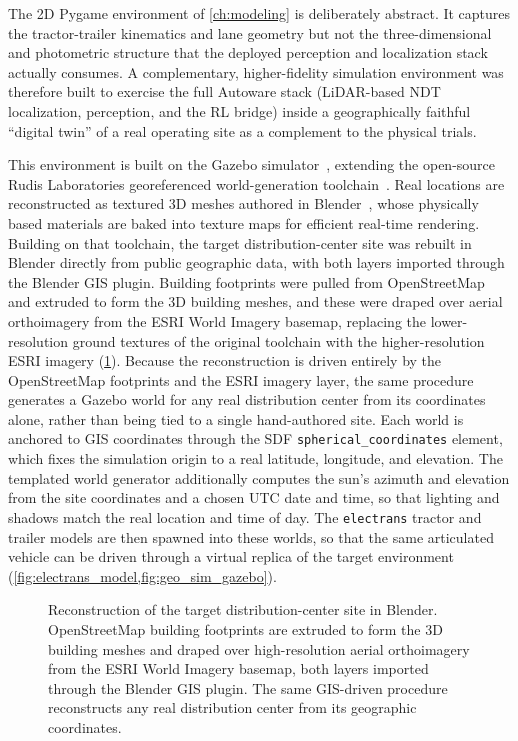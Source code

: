 The 2D Pygame environment of \cref{ch:modeling} is deliberately abstract. It captures the tractor-trailer kinematics and lane geometry but not the three-dimensional and photometric structure that the deployed perception and localization stack actually consumes. A complementary, higher-fidelity simulation environment was therefore built to exercise the full Autoware stack (LiDAR-based NDT localization, perception, and the RL bridge) inside a geographically faithful ``digital twin'' of a real operating site as a complement to the physical trials.

This environment is built on the Gazebo simulator~\cite{koenig2004gazebo}, extending the open-source Rudis Laboratories georeferenced world-generation toolchain~\cite{perseghetti2021rudisworlds}. Real locations are reconstructed as textured 3D meshes authored in Blender~\cite{blender}, whose physically based materials are baked into texture maps for efficient real-time rendering. Building on that toolchain, the target distribution-center site was rebuilt in Blender directly from public geographic data, with both layers imported through the Blender GIS plugin. Building footprints were pulled from OpenStreetMap~\cite{openstreetmap} and extruded to form the 3D building meshes, and these were draped over aerial orthoimagery from the ESRI World Imagery basemap, replacing the lower-resolution ground textures of the original toolchain with the higher-resolution ESRI imagery (\cref{fig:geo_sim_blender}). Because the reconstruction is driven entirely by the OpenStreetMap footprints and the ESRI imagery layer, the same procedure generates a Gazebo world for any real distribution center from its coordinates alone, rather than being tied to a single hand-authored site. Each world is anchored to GIS coordinates through the SDF \texttt{spherical\_coordinates} element, which fixes the simulation origin to a real latitude, longitude, and elevation. The templated world generator additionally computes the sun's azimuth and elevation from the site coordinates and a chosen UTC date and time, so that lighting and shadows match the real location and time of day. The \texttt{electrans} tractor and trailer models are then spawned into these worlds, so that the same articulated vehicle can be driven through a virtual replica of the target environment (\cref{fig:electrans_model,fig:geo_sim_gazebo}).

\begin{figure}[H]
    \centering
    \caption{Reconstruction of the target distribution-center site in Blender. OpenStreetMap building footprints are extruded to form the 3D building meshes and draped over high-resolution aerial orthoimagery from the ESRI World Imagery basemap, both layers imported through the Blender GIS plugin. The same GIS-driven procedure reconstructs any real distribution center from its geographic coordinates.}
    \label{fig:geo_sim_blender}
\end{figure}

